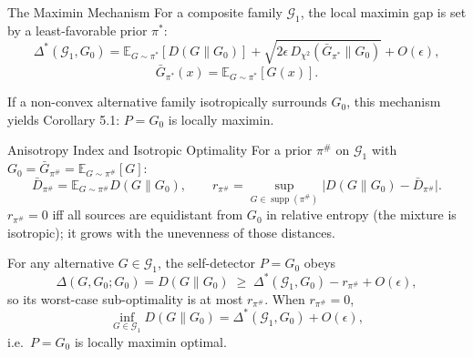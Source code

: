 \documentclass[aspectratio=169, 10pt]{beamer}
\newcommand{\Dkl}[2]{D(#1 \| #2)}
\newcommand{\Dchi}[2]{D_{\chi^2}(#1 \| #2)}
\newcommand{\bigDelta}{\Delta}
\newcommand{\cG}{\mathcal{G}}
\begin{document}
\begin{frame}{The Maximin Mechanism}
  For a composite family \(\cG_1\), the local maximin gap is set by
  a least-favorable prior \(\pi^*\):
  \[
    \bigDelta^*(\cG_1,G_0)
    =
    \mathbb{E}_{G\sim\pi^*}\!\left[\Dkl{G}{G_0}\right]
    +\sqrt{2\epsilon\,\Dchi{\bar G_{\pi^*}}{G_0}}
    +O(\epsilon),
  \]
  \[
    \bar G_{\pi^*}(x)=\mathbb{E}_{G\sim\pi^*}[G(x)].
  \]

  \begin{callout}
    If a non-convex alternative family isotropically surrounds \(G_0\),
    this mechanism yields Corollary 5.1: \(P=G_0\) is locally maximin.
  \end{callout}
\end{frame}

\begin{frame}{Anisotropy Index and Isotropic Optimality}
  For a prior \(\pi^{\#}\) on \(\cG_1\) with \(G_0=\bar G_{\pi^{\#}}=\mathbb{E}_{G\sim\pi^{\#}}[G]\):
  \[
    \bar D_{\pi^{\#}}=\mathbb{E}_{G\sim\pi^{\#}}\Dkl{G}{G_0},
    \qquad
    r_{\pi^{\#}}=\sup_{G\in\operatorname{supp}(\pi^{\#})}
      \bigl|\Dkl{G}{G_0}-\bar D_{\pi^{\#}}\bigr|.
  \]
  \(r_{\pi^{\#}}=0\) iff all sources are equidistant from \(G_0\) in relative
  entropy (the mixture is isotropic); it grows with the unevenness of those
  distances.

  \medskip
  For any alternative \(G\in\cG_1\), the self-detector \(P=G_0\) obeys
  \[
    \bigDelta(G,G_0;G_0)=\Dkl{G}{G_0}
    \;\ge\;\bigDelta^*(\cG_1,G_0)-r_{\pi^{\#}}+O(\epsilon),
  \]
  so its worst-case sub-optimality is at most \(r_{\pi^{\#}}\). When
  \(r_{\pi^{\#}}=0\),
  \[
    \inf_{G\in\cG_1}\Dkl{G}{G_0}=\bigDelta^*(\cG_1,G_0)+O(\epsilon),
  \]
  i.e.\ \(P=G_0\) is locally maximin optimal.
\end{frame}
\end{document}
